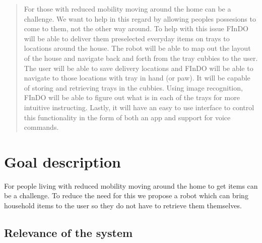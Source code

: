 \documentclass{article}
\begin{document}
 



\begin{abstract} 

For those with reduced mobility moving around the home can be a challenge. We want to help in this regard by allowing peoples possesions to come to them, not the other way around.
To help with this issue FInDO will be able to deliver them preselected everyday items on trays to locations around the house. 
The robot will be able to map out the layout of the house and navigate back and forth from the tray cubbies to the user. 
The user will be able to save delivery locations and FInDO will be able to navigate to those locations with tray in hand (or paw). 
It will be capable of  storing and retrieving trays in the cubbies. Using image recognition, 
FInDO will be able to figure out what is in each of the trays for more intuitive instructing. 
Lastly, it will have an easy to use interface to control this functionality in the form of both an app and support for voice commands.

\end{abstract} 

\section{Goal description} 

For people living with reduced mobility moving around the home to get items can be a challenge. To reduce the need for this we propose a robot which can bring household items to the user so they do not have to retrieve them themselves.
\subsection{Relevance of the system} 
\end{document}

